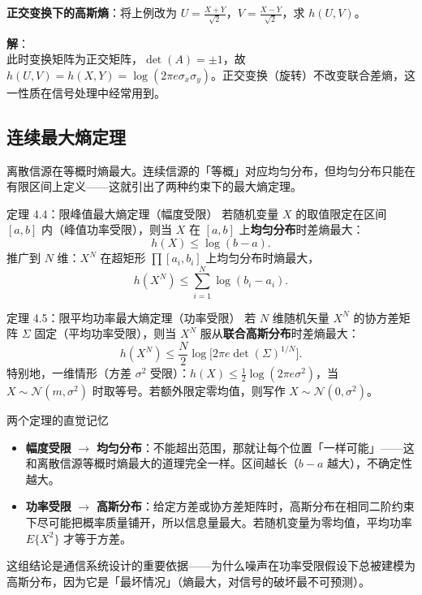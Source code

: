 \begin{example}
\label{ex:gauss-orthogonal}
\textbf{正交变换下的高斯熵}：将上例改为 $U=\frac{X+Y}{\sqrt{2}}$，$V=\frac{X-Y}{\sqrt{2}}$，求 $h(U,V)$。

\noindent \textbf{解}：\\[2pt]
此时变换矩阵为正交矩阵，$\det(A)=\pm1$，故 $h(U,V)=h(X,Y)=\log(2\pi e\sigma_x\sigma_y)$。正交变换（旋转）不改变联合差熵，这一性质在信号处理中经常用到。
\end{example}

\subsection{连续最大熵定理}

离散信源在等概时熵最大。连续信源的「等概」对应均匀分布，但均匀分布只能在有限区间上定义——这就引出了两种约束下的最大熵定理。

\begin{theoremBox}{定理 4.4：限峰值最大熵定理（幅度受限）}
若随机变量 $X$ 的取值限定在区间 $[a,b]$ 内（峰值功率受限），则当 $X$ 在 $[a,b]$ 上\textbf{均匀分布}时差熵最大：
\[
h(X)\le\log(b-a).
\]
推广到 $N$ 维：$X^N$ 在超矩形 $\prod[a_i,b_i]$ 上均匀分布时熵最大，
\[
h(X^N)\le\sum_{i=1}^N\log(b_i-a_i).
\]
\end{theoremBox}

\begin{theoremBox}{定理 4.5：限平均功率最大熵定理（功率受限）}
若 $N$ 维随机矢量 $X^N$ 的协方差矩阵 $\Sigma$ 固定（平均功率受限），则当 $X^N$ 服从\textbf{联合高斯分布}时差熵最大：
\[
h(X^N)\le\frac{N}{2}\log\bigl[2\pi e\det(\Sigma)^{1/N}\bigr].
\]
特别地，一维情形（方差 $\sigma^2$ 受限）：$h(X)\le\frac{1}{2}\log(2\pi e\sigma^2)$，当 $X\sim\mathcal{N}(m,\sigma^2)$ 时取等号。若额外限定零均值，则写作 $X\sim\mathcal{N}(0,\sigma^2)$。
\end{theoremBox}

\begin{keypoint}{两个定理的直觉记忆}
\begin{itemize}
  \item \textbf{幅度受限} $\to$ \textbf{均匀分布}：不能超出范围，那就让每个位置「一样可能」——这和离散信源等概时熵最大的道理完全一样。区间越长（$b-a$ 越大），不确定性越大。
  \item \textbf{功率受限} $\to$ \textbf{高斯分布}：给定方差或协方差矩阵时，高斯分布在相同二阶约束下尽可能把概率质量铺开，所以信息量最大。若随机变量为零均值，平均功率 $E\{X^2\}$ 才等于方差。
\end{itemize}
这组结论是通信系统设计的重要依据——为什么噪声在功率受限假设下总被建模为高斯分布，因为它是「最坏情况」（熵最大，对信号的破坏最不可预测）。
\end{keypoint}

